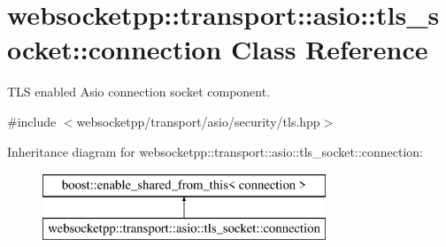 \hypertarget{classwebsocketpp_1_1transport_1_1asio_1_1tls__socket_1_1connection}{}\section{websocketpp\+:\+:transport\+:\+:asio\+:\+:tls\+\_\+socket\+:\+:connection Class Reference}
\label{classwebsocketpp_1_1transport_1_1asio_1_1tls__socket_1_1connection}


T\+L\+S enabled Asio connection socket component.  




{\ttfamily \#include $<$websocketpp/transport/asio/security/tls.\+hpp$>$}

Inheritance diagram for websocketpp\+:\+:transport\+:\+:asio\+:\+:tls\+\_\+socket\+:\+:connection\+:\begin{figure}[H]
\begin{center}
\leavevmode
\includegraphics[height=2.000000cm]{classwebsocketpp_1_1transport_1_1asio_1_1tls__socket_1_1connection}
\end{center}
\end{figure}
